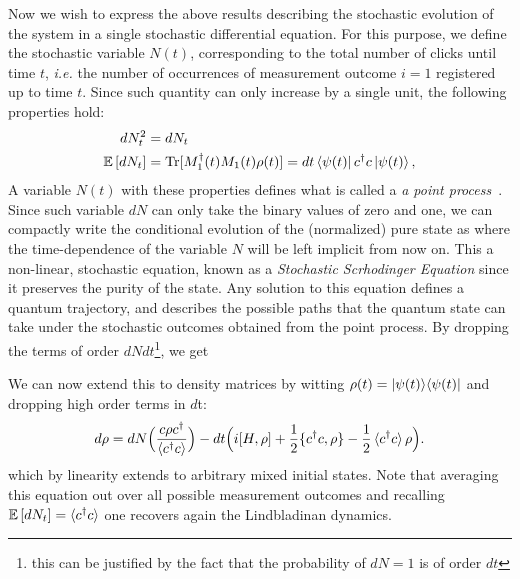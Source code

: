 Now we wish to express the above results describing the stochastic evolution of the system in a single stochastic differential equation. For this purpose, we define the stochastic variable $N(t)$, corresponding to the total number of clicks until time $t$,  \textit{i.e.} the number of occurrences of  measurement outcome $i=1$ registered up to time $t$. Since such quantity can only increase by a single unit, the following properties hold:
\begin{align}\label{eq:pointpro}
dN_t^2 &= dN_t \\
\mathbb{E}\corch{dN_{t}} &= \tr{M_1^\dagger(t) M_1(t) \rho(t)} = dt \bra{\psi(t)}c^\dagger c\ket{\psi(t)},
\end{align}
A variable $N(t)$ with these properties defines what is called a \textit{a point process}~\cite{Dolinar1973,wisemanbook}. Since such variable $dN$ can only take the binary values of zero and one, we can compactly write the conditional evolution of the (normalized) pure state as
where the time-dependence of the variable $N$ will be left implicit from now on. This a non-linear, stochastic equation, known as a \textit{Stochastic Scrhodinger Equation} since it preserves the purity of the state. Any solution to this equation defines a quantum trajectory,
and describes the possible paths that the quantum state can take under the stochastic outcomes obtained from the point process.
By dropping the terms of order $dN dt$\footnote{this can be justified by the fact that the probability of $dN=1$ is of order $dt$}, we get

We can now extend this to density matrices by witting $\rho(t)=\proj{\psi(t)}$ and  dropping high order terms in $d$t:
\begin{align}\label{eq:foto}
d\rho = dN \Big(\frac{c \rho c^\dagger}{\mathinner{\langle c^\dagger c\rangle}}\Big) - dt \Big( i [H,\rho] + \frac{1}{2}\lbrace c^\dagger c, \rho\rbrace - \frac{1}{2}\mathinner{\langle c^\dagger c\rangle} \rho\Big).
\end{align}
which by linearity extends to arbitrary mixed initial states. Note that averaging this equation out over all possible measurement outcomes and recalling $\mathbb{E}\left[ dN_{t}\right] =\mathinner{\langle c^\dagger c\rangle}$ one recovers again  the Lindbladinan dynamics.

